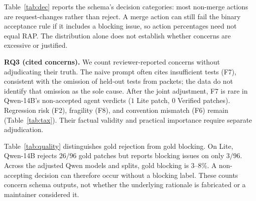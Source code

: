 \documentclass[10pt,conference]{IEEEtran}
\begin{document}
Table~\ref{tab:dec}
reports the schema's decision categories: most non-merge actions are request-changes rather
than reject. A merge action can still fail the binary acceptance rule if it includes a
blocking issue, so action percentages need not equal RAP. The distribution alone does not
establish whether concerns are excessive or justified.

\begin{table}[t]
\centering
\caption{Decision distribution under the adjusted reviewers. Non-merge is dominated by
request-changes rather than reject, and agent and gold distributions track each other.}
\label{tab:dec}
\footnotesize

\end{table}


\textbf{RQ3 (cited concerns).} We count reviewer-reported concerns without adjudicating
their truth. The naive prompt often cites insufficient tests (F7), consistent with the
omission of held-out tests from packets; the data do not identify that omission as the
sole cause. After the joint adjustment, F7 is rare in Qwen-14B's non-accepted agent verdicts
($1$ Lite patch, $0$ Verified patches). Regression risk (F2), fragility (F8), and convention
mismatch (F6) remain (Table~\ref{tab:tax}). Their factual validity and practical importance
require separate adjudication.

\begin{table}[t]
\centering
\caption{Failure modes cited on non-accepted agent patches under the adjusted
reviewer (count of patches flagged, any severity).}
\label{tab:tax}
\small

\end{table}

\begin{table}[t]
\centering
\caption{Adjusted Qwen verdicts on gold. Gold blocking is the share reporting at least one blocking issue, not an adjudicated hallucination rate or the complement of gold acceptance.}
\label{tab:quality}
\footnotesize
\resizebox{\columnwidth}{!}{}
\end{table}


Table~\ref{tab:quality} distinguishes gold rejection from gold blocking. On Lite, Qwen-14B
rejects $26/96$ gold patches but reports blocking issues on only $3/96$. Across the adjusted
Qwen models and splits, gold blocking is $3$--$8\%$. A non-accepting decision can therefore
occur without a blocking label. These counts concern schema outputs, not whether the
underlying rationale is fabricated or a maintainer considered it.
\end{document}

